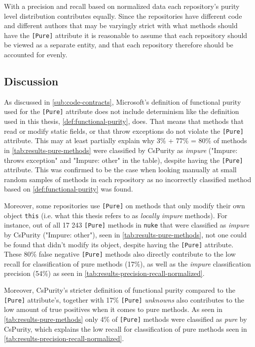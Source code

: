 \documentclass[a4paper,12pt]{article}
\begin{document}
With a precision and recall based on normalized data each repository's purity level distribution contributes equally. %
Since the repositories have different code and different authors that may be varyingly strict with what methods should have the \texttt{[Pure]} attribute it is reasonable to assume that each repository should be viewed as a separate entity, and that each repository therefore should be accounted for evenly.

\subsection{Discussion} \label{sub:discussion}

As discussed in \autoref{sub:code-contracts}, Microsoft's definition of functional purity used for the \texttt{[Pure]} attribute does not include determinism like the definition used in this thesis, \autoref{def:functional-purity}, does. That means that methods that read or modify static fields, or that throw exceptions do not violate the \texttt{[Pure]} attribute. This may at least partially explain why 3\% + 77\% = 80\% of methods in \autoref{tab:results-pure-methods} were classified by CsPurity as \textit{impure} ("Impure: throws exception" and "Impure: other" in the table), despite having the \texttt{[Pure]} attribute. This was confirmed to be the case when looking manually at small random samples of methods in each repository as no incorrectly classified method based on \autoref{def:functional-purity} was found.

Moreover, some repositories use \texttt{[Pure]} on methods that only modify their own object \texttt{this} (i.e. what this thesis refers to as \textit{locally impure} methods). For instance, out of all 17 243 \texttt{[Pure]} methods in \texttt{nuke} that were classified as \textit{impure} by CsPurity ("Impure: other"), seen in \autoref{tab:results-pure-methods}, not one could be found that didn't modify its object, despite having the \texttt{[Pure]} attribute. These 80\% false negative \texttt{[Pure]} methods also directly contribute to the low recall for classification of pure methods (17\%), as well as the \textit{impure} classification precision (54\%) as seen in \autoref{tab:results-precision-recall-normalized}.

Moreover, CsPurity's stricter definition of functional purity compared to the \texttt{[Pure]} attribute's, together with 17\% \texttt{[Pure]} \textit{unknowns} also contributes to the low amount of true positives when it comes to pure methods. As seen in \autoref{tab:results-pure-methods} only 4\% of \texttt{[Pure]} methods were classified as \textit{pure} by CsPurity, which explains the low recall for classification of pure methods seen in \autoref{tab:results-precision-recall-normalized}.
\end{document}
